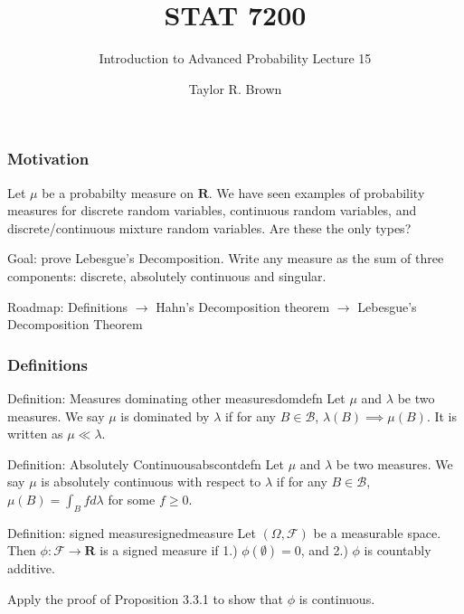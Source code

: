 \documentclass[handout]{beamer}
\title{STAT 7200}
\subtitle{Introduction to Advanced Probability \newline Lecture 15}
\author{Taylor R. Brown}
\institute{}
\date{}
\begin{document}
\frame{\titlepage}

\section[Outline]{}


\section[Beginnings]{}
\frame
{
\frametitle{Motivation} 

Let $\mu$ be a probabilty measure on $\mathbf{R}$. We have seen examples of probability measures for discrete random variables, continuous random variables, and discrete/continuous mixture random variables. Are these the only types?
\newline

Goal: prove Lebesgue's Decomposition. Write any measure as the sum of three components: discrete, absolutely continuous and singular.
\newline


Roadmap: Definitions $\to$ Hahn's Decomposition theorem $\to$ Lebesgue's Decomposition Theorem
\newline



}



\frame
{
\frametitle{Definitions} 


\begin{mytheo}{Definition: Measures dominating other measures}{domdefn}
Let $\mu$ and $\lambda$ be two measures. We say $\mu$ is dominated by $\lambda$ if for any $B \in \mathcal{B}$, $\lambda(B) \implies \mu(B).$ It is written as $\mu \ll \lambda$.
\end{mytheo}

\begin{mytheo}{Definition: Absolutely Continuous}{abscontdefn}
Let $\mu$ and $\lambda$ be two measures. We say $\mu$ is absolutely continuous with respect to $\lambda$ if for any $B \in \mathcal{B}$, $\mu(B) = \int_B f d\lambda$ for some $f \ge 0$.
\end{mytheo}


\begin{mytheo}{Definition: signed measure}{signedmeasure}
Let $(\Omega, \mathcal{F})$ be a measurable space. Then $\phi : \mathcal{F} \to \mathbf{R}$ is a signed measure if 1.) $\phi(\emptyset) = 0$, and 2.) $\phi$ is countably additive.
\end{mytheo}

Apply the proof of Proposition 3.3.1 to show that $\phi$ is continuous.


%   
%                                            

}
\end{document}
